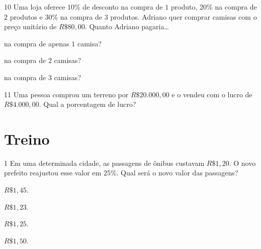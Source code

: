 
\num{10}  Uma loja oferece $10\%$ de desconto na compra de $1$ produto, $20\%$ na
compra de $2$ produtos e $30\%$ na compra de $3$ produtos. Adriano quer
comprar camisas com o preço unitário de $R\$80,00$. Quanto Adriano
pagaria\ldots{}

\begin{escolha}
\item na compra de apenas $1$ camisa? 
\item na compra de $2$ camisas? 
\item na compra de $3$ camisas? 
\end{escolha}

\num{11}  Uma pessoa comprou um terreno por $R\$20.000,00$ e o vendeu com o
lucro de $R\$4.000,00$. Qual a porcentagem de lucro?


\section{Treino}

\num{1}  Em uma determinada cidade, as passagens de ônibus custavam $R\$1,20$. O
novo prefeito reajustou esse valor em $25\%$. Qual será o novo valor das
passagens?

\begin{escolha}
\item $R\$1,45$.
\item $R\$1,23$.
\item $R\$1,25$.
\item $R\$1,50$.
\end{escolha}



